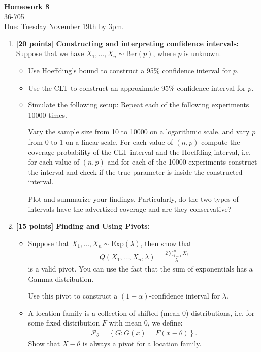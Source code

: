 \documentclass[12pt]{article}
\begin{document}
\begin{center}
{\bf Homework 8}\\
36-705\\
Due: Tuesday November 19th by 3pm.\\

\end{center}

\begin{enumerate}
\item {\bf [20 points] Constructing and interpreting confidence intervals: } Suppose that we have $X_1,\ldots,X_n \sim \text{Ber}(p)$, where $p$ is unknown. 
\begin{itemize}
\item Use Hoeffding's bound to construct a 95\% confidence interval for $p$.
\item Use the CLT to construct an approximate 95\% confidence interval for $p$.
\item Simulate the following setup: Repeat each of the following experiments 10000 times. 

Vary the sample size from 10 to 10000 on a logarithmic scale, and vary $p$ from $0$ to $1$ on a linear scale. For each value of $(n,p)$ compute the coverage probability of the CLT interval and the Hoeffding interval, i.e. for each value of $(n,p)$ and for each of the 10000 experiments construct the interval and check if the true parameter is inside the constructed interval.

Plot and summarize your findings. Particularly, do the two types of intervals have the advertized coverage and are they conservative?
\end{itemize}

\item {\bf [15 points] Finding and Using Pivots: } 
\begin{itemize}
\item Suppose that $X_1,\ldots,X_n \sim \text{Exp}(\lambda)$, then show that 
\begin{align*}
Q(X_1,\ldots,X_n,\lambda) = \frac{2 \sum_{i=1}^n X_i}{\lambda}
\end{align*} 
is a valid pivot. You can use the fact that the sum of exponentials has a Gamma distribution.

Use this pivot to construct a $(1-\alpha)$-confidence interval for $\lambda$.

\item A location family is a collection of shifted (mean 0) distributions, i.e. for some fixed distribution $F$ with mean 0, we define:
\begin{align*}
\mathcal{P}_{\theta} = \left\{ G : G(x) = F(x - \theta) \right\}.
\end{align*}
Show that $\overline{X} - \theta$ is always a pivot for a location family. 
\end{itemize}


\end{enumerate}
\end{document}
